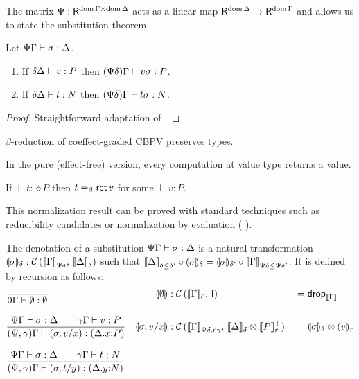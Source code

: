 \documentclass[acmsmall,review,anonymous]{acmart}\settopmatter{printfolios=true,printccs=false,printacmref=false}
\begin{document}
The matrix $\Psi : \R^{\dom \Gamma \times \dom \Delta}$ acts as a
linear map $\R^{\dom \Delta} \to \R^{\dom \Gamma}$ and allows us to
state the substitution theorem.
\begin{theorem}
  Let $\SubstTy \Psi \Gamma \sigma \Delta$.
  \begin{enumerate}
  \item If $\qValTy \delta \Delta v P$ then $\pValTy {\Psi\delta} \Gamma {v\sigma} P$.
  \item If $\qCompTy \delta \Delta t N$ then
    $\pCompTy {\Psi\delta} \Gamma {t\sigma} N$.
  \end{enumerate}
\end{theorem}
\begin{proof}
  Straightforward adaptation of \citet{atkeyWood:types19}.
\end{proof}
\begin{corollary}
  $\beta$-reduction of coeffect-graded CBPV preserves types.
\end{corollary}
In the pure (effect-free) version, every computation at value type
returns a value.
\begin{conjecture}
  If $\vdash t : \diamond P$ then $t =_{\beta} \ret v$ for some $\vdash v : P$.
\end{conjecture}
This normalization result can be proved with standard techniques such
as reducibility candidates or normalization by evaluation (\cf
\citet{abelSattler:ppdp19}).

The denotation of a substitution $\SubstTy \Psi \Gamma \sigma \Delta$
is a natural transformation
$\denv \sigma \delta : \Hom {\Den \Gamma {\Psi\delta}} {\Den \Delta
  \delta}$
such that
$
\Den \Delta {\delta \leq \delta'}
\comp
\denv \sigma \delta
=
\denv \sigma {\delta'}
\comp
\Den \Gamma {\Psi\delta \leq \Psi\delta'}
$.
It is defined by recursion as follows:
\begin{align*}
& \ru{
    }{\SubstTy {0} \Gamma \sempty \cempty}
& \dent \sempty
& : \Hom {\Den\Gamma 0} \I
& & = \tdrop[\den\Gamma]
\\[2ex]
& \ru{\SubstTy \Psi \Gamma \sigma \Delta \qquad
      \qValTy \gamma \Gamma v P
    }{\pSubstTy {\Psi,\gamma} \Gamma {\sext \sigma x v} {\ext \Delta x P}}
& \dent{\sext \sigma x v}
& : \Hom  {\Den\Gamma{\Psi\delta,r\gamma}} {\Den \Delta \delta \otimes \Denp P r}
& & = \denv \sigma \delta \otimes \denv v r
\\[2ex]
& \ru{\SubstTy \Psi \Gamma \sigma \Delta \qquad
      \qCompTy \gamma \Gamma t N
    }{\pSubstTy {\Psi,\gamma} \Gamma {\sext \sigma y t} {\ext \Delta y N}}
\end{align*}
\end{document}

